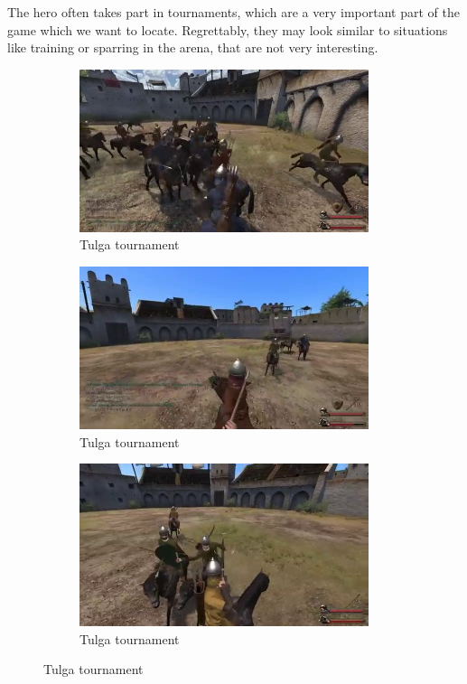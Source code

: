 \documentclass[
]{article}
\begin{document}
\newpage

The hero often takes part in tournaments, which are a very important
part of the game which we want to locate. Regrettably, they may look similar to situations like training or sparring in the arena, that are not very interesting.



\begin{figure}
	\centering
	\begin{subfigure}[b]{0.3\textwidth}
		\includegraphics[width=\linewidth]{docimages/E_0057_00_21_48.jpg}
		\caption{Tulga tournament}
	\end{subfigure}
	\begin{subfigure}[b]{0.3\textwidth}
		\includegraphics[width=\linewidth]{docimages/E_0061_00_25_56.jpg}
		\caption{Tulga tournament}
	\end{subfigure}
	\begin{subfigure}[b]{0.3\textwidth}
		\includegraphics[width=\linewidth]{docimages/E_0042_00_12_48.jpg}
		\caption{Tulga tournament}
	\end{subfigure}
\end{figure}
\end{document}
